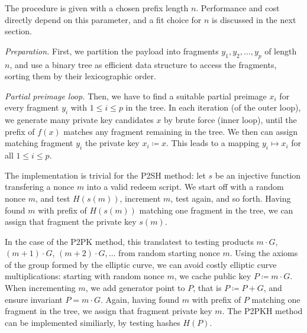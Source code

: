 \documentclass[10pt,a4paper,twocolumn]{article}
\begin{document}
The procedure is given with a chosen prefix length $n$. Performance and cost directly depend on this parameter, and a fit choice for $n$ is discussed in the next section.

\emph{Preparation.} First, we partition the payload into fragments $y_1, y_2, \dots, y_p$ of length $n$, and use a binary tree as efficient data structure to access the fragments, sorting them by their lexicographic order.

\emph{Partial preimage loop.} 
Then, we have to find a suitable partial preimage $x_i$ for every fragment $y_i$ with $1\leq i \leq p$ in the tree.
In each iteration (of the outer loop), we generate many private key candidates $x$ by brute force (inner loop), until the prefix of $f(x)$ matches any fragment remaining in the tree.
We then can assign matching fragment $y_i$ the private key $x_i \coloneqq x$.
This leads to a mapping $y_i \mapsto x_i$ for all $1\leq i\leq p$.

The implementation is trivial for the P2SH method: let $s$ be an injective function transfering a nonce $m$ into a valid redeem script.
We start off with a random nonce $m$, and test $H(s(m))$, increment $m$, test again, and so forth.
Having found $m$ with prefix of $H(s(m))$ matching one fragment in the tree, we can assign that fragment the private key $s(m)$.

In the case of the P2PK method, this translatest to testing products $m\cdot G$, $(m{+}1)\cdot G$, $(m{+}2)\cdot G,\dots$ from random starting nonce $m$.
Using the axioms of the group formed by the elliptic curve, we can avoid costly elliptic curve multiplications: starting with random nonce $m$, we cache public key $P\coloneqq m\cdot G$.
When incrementing $m$, we add generator point to $P$, that is $P\coloneqq P+G$, and ensure invariant $P= m\cdot G$.
Again, having found $m$ with prefix of $P$ matching one fragment in the tree, we assign that fragment private key $m$.
The P2PKH method can be implemented similiarly, by testing hashes $H(P)$.
\end{document}

